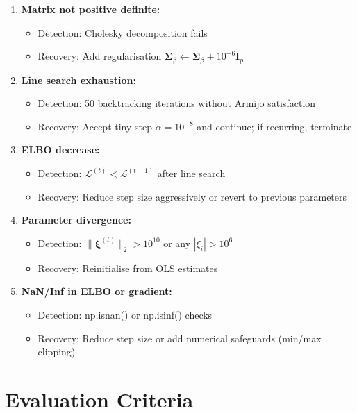 \documentclass[11pt,a4paper]{article}
\begin{document}
\begin{enumerate}
\item \textbf{Matrix not positive definite:}
\begin{itemize}
\item Detection: Cholesky decomposition fails
\item Recovery: Add regularisation $\bm{\Sigma}_\beta \leftarrow \bm{\Sigma}_\beta + 10^{-6} \bm{I}_p$
\end{itemize}

\item \textbf{Line search exhaustion:}
\begin{itemize}
\item Detection: 50 backtracking iterations without Armijo satisfaction
\item Recovery: Accept tiny step $\alpha = 10^{-8}$ and continue; if recurring, terminate
\end{itemize}

\item \textbf{ELBO decrease:}
\begin{itemize}
\item Detection: $\mathcal{L}^{(t)} < \mathcal{L}^{(t-1)}$ after line search
\item Recovery: Reduce step size aggressively or revert to previous parameters
\end{itemize}

\item \textbf{Parameter divergence:}
\begin{itemize}
\item Detection: $\|\bm{\xi}^{(t)}\|_2 > 10^{10}$ or any $|\xi_i| > 10^{6}$
\item Recovery: Reinitialise from OLS estimates
\end{itemize}

\item \textbf{NaN/Inf in ELBO or gradient:}
\begin{itemize}
\item Detection: np.isnan() or np.isinf() checks
\item Recovery: Reduce step size or add numerical safeguards (min/max clipping)
\end{itemize}
\end{enumerate}

\section{Evaluation Criteria}
\end{document}
